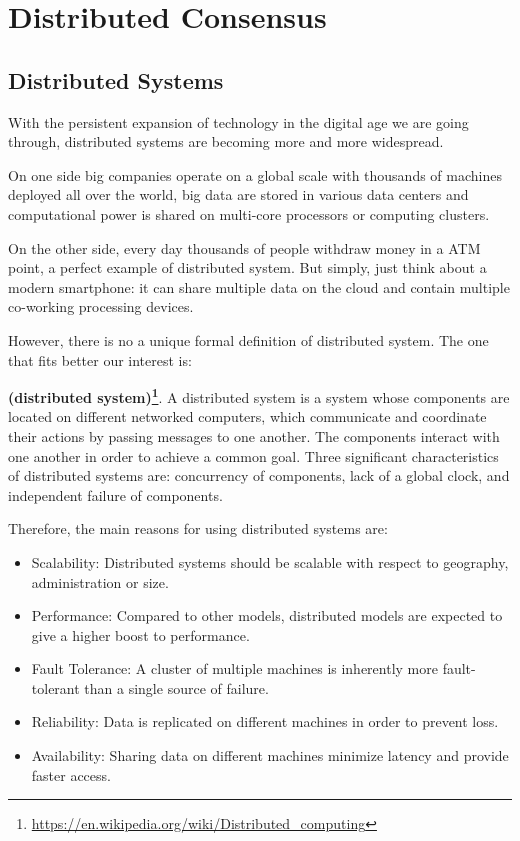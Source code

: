 \chapter{Distributed Consensus}
\label{chpr:consensus}

\bigskip
\section{Distributed Systems}
\label{sec:distributed-systems}
With the persistent expansion of technology in the digital age we are going through, distributed systems are becoming more and more widespread.

\bigskip
\noindent
On one side big companies operate on a global scale with thousands of machines deployed all over the world, big data are stored in various data centers and computational power is shared on multi-core processors or computing clusters.

\bigskip
\noindent
On the other side, every day thousands of people withdraw money in a ATM point, a perfect example of distributed system. But simply, just think about a modern smartphone: it can share multiple data on the cloud and contain multiple co-working processing devices.

\bigskip
\noindent
However, there is no a unique formal definition of distributed system. The one that fits better our interest is:
\begin{mydef} {\bf (distributed system)\footnote{\url{https://en.wikipedia.org/wiki/Distributed_computing}}}.
    A distributed system is a system whose components are located on different networked computers, which communicate and coordinate their actions by passing messages to one another. The components interact with one another in order to achieve a common goal. Three significant characteristics of distributed systems are: concurrency of components, lack of a global clock, and independent failure of components.
\end{mydef}

\bigskip
\noindent
Therefore, the main reasons for using distributed systems are:
\begin{itemize}
    \item Scalability: Distributed systems should be scalable with respect to geography, administration or size.
    \item Performance: Compared to other models, distributed models are expected to give a higher boost to performance.
    \item Fault Tolerance: A cluster of multiple machines is inherently more fault-tolerant than a single source of failure.
    \item Reliability: Data is replicated on different machines in order to prevent loss.
    \item Availability: Sharing data on different machines minimize latency and provide faster access.
\end{itemize}

